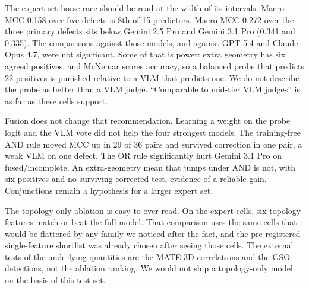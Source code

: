 The expert-set horse-race should be read at the width of its intervals.
Macro MCC 0.158 over five defects is 8th of 15 predictors.
Macro MCC 0.272 over the three primary defects sits below Gemini 2.5 Pro and Gemini 3.1 Pro (0.341 and 0.335).
The comparisons against those models, and against GPT-5.4 and Claude Opus 4.7, were not significant.
Some of that is power: extra geometry has six agreed positives, and McNemar scores accuracy, so a balanced probe that predicts 22 positives is punished relative to a VLM that predicts one.
We do not describe the probe as better than a VLM judge.
``Comparable to mid-tier VLM judges'' is as far as these cells support.

Fusion does not change that recommendation.
Learning a weight on the probe logit and the VLM vote did not help the four strongest models.
The training-free AND rule moved MCC up in 29 of 36 pairs and survived correction in one pair, a weak VLM on one defect.
The OR rule significantly hurt Gemini 3.1 Pro on fused/incomplete.
An extra-geometry mean that jumps under AND is not, with six positives and no surviving corrected test, evidence of a reliable gain.
Conjunctions remain a hypothesis for a larger expert set.

The topology-only ablation is easy to over-read.
On the expert cells, six topology features match or beat the full model.
That comparison uses the same cells that would be flattered by any family we noticed after the fact, and the pre-registered single-feature shortlist was already chosen after seeing those cells.
The external tests of the underlying quantities are the MATE-3D correlations and the GSO detections, not the ablation ranking.
We would not ship a topology-only model on the basis of this test set.

